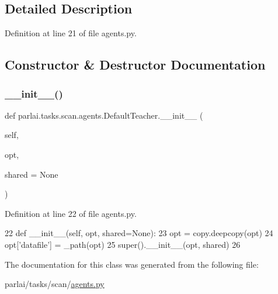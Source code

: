 \subsection{Detailed Description}


Definition at line 21 of file agents.\+py.



\subsection{Constructor \& Destructor Documentation}
\mbox{\label{classparlai_1_1tasks_1_1scan_1_1agents_1_1DefaultTeacher_a113f70356b142f1e9db8e80362287876}} 
\subsubsection{\texorpdfstring{\+\_\+\+\_\+init\+\_\+\+\_\+()}{\_\_init\_\_()}}
{\footnotesize\ttfamily def parlai.\+tasks.\+scan.\+agents.\+Default\+Teacher.\+\_\+\+\_\+init\+\_\+\+\_\+ (\begin{DoxyParamCaption}\item[{}]{self,  }\item[{}]{opt,  }\item[{}]{shared = {\ttfamily None} }\end{DoxyParamCaption})}



Definition at line 22 of file agents.\+py.


\begin{DoxyCode}
22     \textcolor{keyword}{def }\_\_init\_\_(self, opt, shared=None):
23         opt = copy.deepcopy(opt)
24         opt[\textcolor{stringliteral}{'datafile'}] = \_path(opt)
25         super().\_\_init\_\_(opt, shared)
26 \end{DoxyCode}


The documentation for this class was generated from the following file\+:\begin{DoxyCompactItemize}
\item 
parlai/tasks/scan/\hyperlink{parlai_2tasks_2scan_2agents_8py}{agents.\+py}\end{DoxyCompactItemize}
